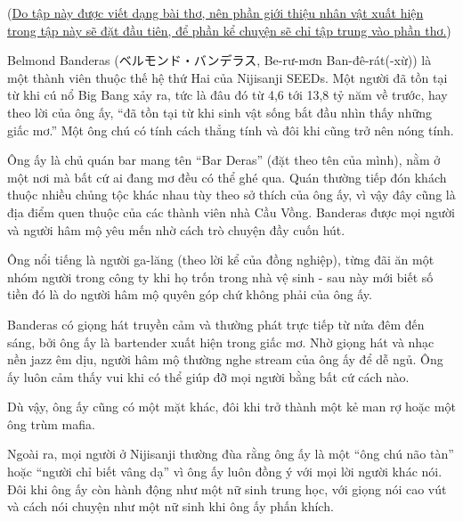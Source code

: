 \documentclass[../main.tex]{subfiles}
\begin{document}

\color{black}

\begin{center}(\uline{Do tập này được viết dạng bài thơ, nên phần giới thiệu nhân vật xuất hiện trong tập này sẽ đặt đầu tiên, để phần kể chuyện sẽ chỉ tập trung vào phần thơ.})\end{center}

\chrint

Belmond Banderas (ベルモンド・バンデラス, Be-rư-mơn Ban-đê-rát(-xừ)) là một thành viên thuộc thế hệ thứ Hai của Nijisanji SEEDs. Một người đã tồn tại từ khi cú nổ Big Bang xảy ra, tức là đâu đó từ 4,6 tới 13,8 tỷ năm về trước, hay theo lời của ông ấy, ``đã  tồn tại từ khi sinh vật sống bắt đầu nhìn thấy những giấc mơ.'' Một ông chú có tính cách thẳng tính và đôi khi cũng trở nên nóng tính.

Ông ấy là chủ quán bar mang tên ``Bar Deras'' (đặt theo tên của mình), nằm ở một nơi mà bất cứ ai đang mơ đều có thể ghé qua. Quán thường tiếp đón khách thuộc nhiều chủng tộc khác nhau tùy theo sở thích của ông ấy, vì vậy đây cũng là địa điểm quen thuộc của các thành viên nhà Cầu Vồng. Banderas được mọi người và người hâm mộ yêu mến nhờ cách trò chuyện đầy cuốn hút.

Ông nổi tiếng là người ga-lăng (theo lời kể của đồng nghiệp), từng đãi ăn một nhóm người trong công ty khi họ trốn trong nhà vệ sinh - sau này mới biết số tiền đó là do người hâm mộ quyên góp chứ không phải của ông ấy.



Banderas có giọng hát truyền cảm và thường phát trực tiếp từ nửa đêm đến sáng, bởi ông ấy là bartender xuất hiện trong giấc mơ. Nhờ giọng hát và nhạc nền jazz êm dịu, người hâm mộ thường nghe stream của ông ấy để dễ ngủ. Ông ấy luôn cảm thấy vui khi có thể giúp đỡ mọi người bằng bất cứ cách nào.

Dù vậy, ông ấy cũng có một mặt khác, đôi khi trở thành một kẻ man rợ hoặc một ông trùm mafia.

Ngoài ra, mọi người ở Nijisanji thường đùa rằng ông ấy là một ``ông chú não tàn'' hoặc ``người chỉ biết vâng dạ'' vì ông ấy luôn đồng ý với mọi lời người khác nói. Đôi khi ông ấy còn hành động như một nữ sinh trung học, với giọng nói cao vút và cách nói chuyện như một nữ sinh khi ông ấy phấn khích.
\end{document}
